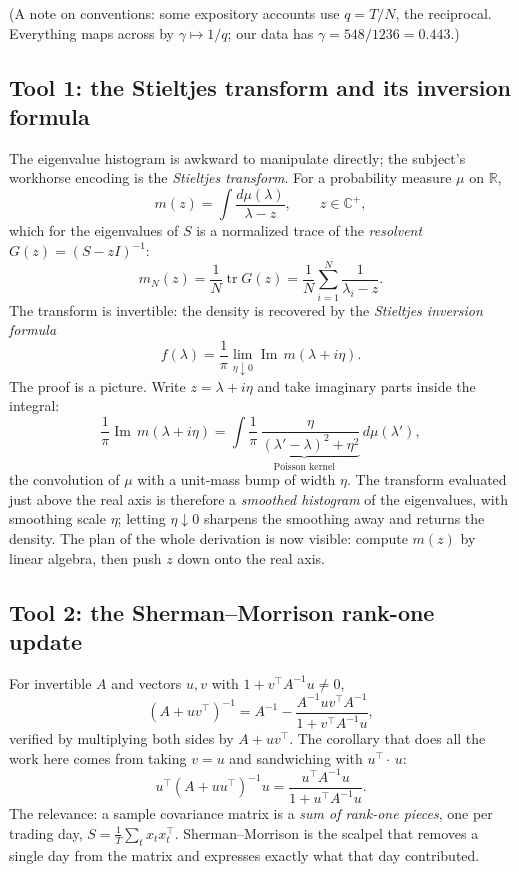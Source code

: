 \documentclass[11pt]{article}
\newcommand{\tr}{\operatorname{tr}}
\newcommand{\Imag}{\operatorname{Im}}
\begin{document}
(A note on conventions: some expository accounts use $q=T/N$, the
reciprocal. Everything maps across by $\gamma\mapsto1/q$; our data has
$\gamma=548/1236=0.443$.)

\subsection{Tool 1: the Stieltjes transform and its inversion formula}

The eigenvalue histogram is awkward to manipulate directly; the subject's
workhorse encoding is the \emph{Stieltjes transform}. For a probability
measure $\mu$ on $\mathbb R$,
\begin{equation}
m(z)=\int\frac{d\mu(\lambda)}{\lambda-z},\qquad z\in\mathbb C^{+},
\end{equation}
which for the eigenvalues of $S$ is a normalized trace of the
\emph{resolvent} $G(z)=(S-zI)^{-1}$:
\begin{equation}
m_N(z)=\frac1N\tr G(z)=\frac1N\sum_{i=1}^{N}\frac{1}{\lambda_i-z}.
\end{equation}
The transform is invertible: the density is recovered by the
\emph{Stieltjes inversion formula}
\begin{equation}
f(\lambda)=\frac1\pi\lim_{\eta\downarrow0}\Imag\,m(\lambda+i\eta).
\label{eq:inversion}
\end{equation}
The proof is a picture. Write $z = \lambda + i\eta$ and take imaginary
parts inside the integral:
\[
\frac1\pi\Imag\,m(\lambda+i\eta)
=\int
\underbrace{\frac{1}{\pi}\,
\frac{\eta}{(\lambda'-\lambda)^{2}+\eta^{2}}}_{\text{Poisson kernel}}
\,d\mu(\lambda'),
\]
the convolution of $\mu$ with a unit-mass bump of width $\eta$. The
transform evaluated just above the real axis is therefore a
\emph{smoothed histogram} of the eigenvalues, with smoothing scale $\eta$;
letting $\eta\downarrow0$ sharpens the smoothing away and returns the
density. The plan of the whole derivation is now visible: compute $m(z)$
by linear algebra, then push $z$ down onto the real axis.

\subsection{Tool 2: the Sherman--Morrison rank-one update}

For invertible $A$ and vectors $u,v$ with $1+v^{\top}A^{-1}u\neq0$,
\begin{equation}
(A+uv^{\top})^{-1}
=A^{-1}-\frac{A^{-1}uv^{\top}A^{-1}}{1+v^{\top}A^{-1}u},
\label{eq:sm}
\end{equation}
verified by multiplying both sides by $A+uv^{\top}$. The corollary that
does all the work here comes from taking $v=u$ and sandwiching with
$u^{\top}\!\cdot\, u$:
\begin{equation}
u^{\top}(A+uu^{\top})^{-1}u
=\frac{u^{\top}A^{-1}u}{1+u^{\top}A^{-1}u}.
\label{eq:sm-quad}
\end{equation}
The relevance: a sample covariance matrix is a \emph{sum of rank-one
pieces}, one per trading day, $S=\frac1T\sum_t x_t x_t^{\top}$.
Sherman--Morrison is the scalpel that removes a single day from the matrix
and expresses exactly what that day contributed.
\end{document}
